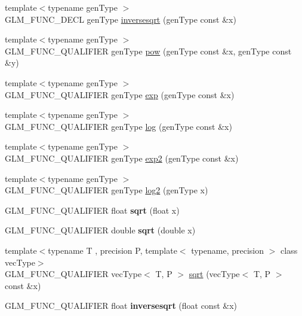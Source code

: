 \begin{DoxyCompactItemize}
{\footnotesize template$<$typename gen\+Type $>$ }\\G\+L\+M\+\_\+\+F\+U\+N\+C\+\_\+\+D\+E\+CL gen\+Type \hyperlink{group__core__func__exponential_ga5ac08ead2e50ad0295b9ad85a3e449e9}{inversesqrt} (gen\+Type const \&x)
\item 
{\footnotesize template$<$typename gen\+Type $>$ }\\G\+L\+M\+\_\+\+F\+U\+N\+C\+\_\+\+Q\+U\+A\+L\+I\+F\+I\+ER gen\+Type \hyperlink{group__core__func__exponential_ga1ce4b2fddd26d0d3a35a8d98f37f3ac0}{pow} (gen\+Type const \&x, gen\+Type const \&y)
\item 
{\footnotesize template$<$typename gen\+Type $>$ }\\G\+L\+M\+\_\+\+F\+U\+N\+C\+\_\+\+Q\+U\+A\+L\+I\+F\+I\+ER gen\+Type \hyperlink{group__core__func__exponential_gae154699ba6bda068d4b87cf9b987381f}{exp} (gen\+Type const \&x)
\item 
{\footnotesize template$<$typename gen\+Type $>$ }\\G\+L\+M\+\_\+\+F\+U\+N\+C\+\_\+\+Q\+U\+A\+L\+I\+F\+I\+ER gen\+Type \hyperlink{group__core__func__exponential_ga0c8da2d2921da250e8700ac4476916a1}{log} (gen\+Type const \&x)
\item 
{\footnotesize template$<$typename gen\+Type $>$ }\\G\+L\+M\+\_\+\+F\+U\+N\+C\+\_\+\+Q\+U\+A\+L\+I\+F\+I\+ER gen\+Type \hyperlink{group__core__func__exponential_gac45997fb3ac907cad408d6da0a0f5f54}{exp2} (gen\+Type const \&x)
\item 
{\footnotesize template$<$typename gen\+Type $>$ }\\G\+L\+M\+\_\+\+F\+U\+N\+C\+\_\+\+Q\+U\+A\+L\+I\+F\+I\+ER gen\+Type \hyperlink{group__core__func__exponential_gad41e336e9bc8190fe99d2cfd9261c19b}{log2} (gen\+Type x)
\item 
G\+L\+M\+\_\+\+F\+U\+N\+C\+\_\+\+Q\+U\+A\+L\+I\+F\+I\+ER float {\bfseries sqrt} (float x)\hypertarget{namespaceglm_aef7d852d92e7b9e556300aaf14863741}{}\label{namespaceglm_aef7d852d92e7b9e556300aaf14863741}

\item 
G\+L\+M\+\_\+\+F\+U\+N\+C\+\_\+\+Q\+U\+A\+L\+I\+F\+I\+ER double {\bfseries sqrt} (double x)\hypertarget{namespaceglm_a71f6d03bb8b54de18812b782194f6ac5}{}\label{namespaceglm_a71f6d03bb8b54de18812b782194f6ac5}

\item 
{\footnotesize template$<$typename T , precision P, template$<$ typename, precision $>$ class vec\+Type$>$ }\\G\+L\+M\+\_\+\+F\+U\+N\+C\+\_\+\+Q\+U\+A\+L\+I\+F\+I\+ER vec\+Type$<$ T, P $>$ \hyperlink{group__core__func__exponential_ga2ea6c6738ad6e09ec3405a628047801b}{sqrt} (vec\+Type$<$ T, P $>$ const \&x)
\item 
G\+L\+M\+\_\+\+F\+U\+N\+C\+\_\+\+Q\+U\+A\+L\+I\+F\+I\+ER float {\bfseries inversesqrt} (float const \&x)\hypertarget{namespaceglm_af2e9f33f212954ecca568cf1485ccbe8}{}\label{namespaceglm_af2e9f33f212954ecca568cf1485ccbe8}


\end{DoxyCompactItemize}
